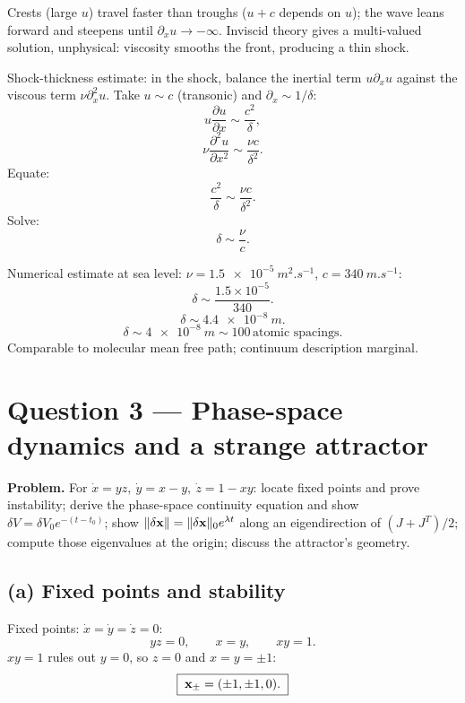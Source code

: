 \documentclass[11pt]{article}
\newcommand{\pd}[2]{\frac{\partial #1}{\partial #2}}
\newcommand{\pdd}[2]{\frac{\partial^{2} #1}{\partial #2^{2}}}
\begin{document}
Crests (large $u$) travel faster than troughs ($u+c$ depends on $u$); the wave leans forward and steepens until $\partial_x u\to-\infty$. Inviscid theory gives a multi-valued solution, unphysical: viscosity smooths the front, producing a thin shock.

Shock-thickness estimate: in the shock, balance the inertial term $u\partial_x u$ against the viscous term $\nu\partial_x^2 u$. Take $u\sim c$ (transonic) and $\partial_x \sim 1/\delta$:
\[ u\pd{u}{x} \sim \frac{c^2}{\delta}, \]
\[ \nu\pdd{u}{x} \sim \frac{\nu c}{\delta^2}. \]
Equate:
\[ \frac{c^2}{\delta} \sim \frac{\nu c}{\delta^2}. \]
Solve:
\begin{equation}
\boxed{\;\delta \sim \frac{\nu}{c}.\;}
\label{eq:shockwidth}
\end{equation}

Numerical estimate at sea level: $\nu = \SI{1.5e-5}{m^2.s^{-1}}$, $c=\SI{340}{m.s^{-1}}$:
\[ \delta \sim \frac{1.5\times 10^{-5}}{340}. \]
\[ \delta \sim \SI{4.4e-8}{m}. \]
\[ \boxed{\;\delta \sim \SI{4e-8}{m} \sim 100\,\text{atomic spacings}.\;} \]
Comparable to molecular mean free path; continuum description marginal.

\section*{Question 3 --- Phase-space dynamics and a strange attractor}

\textbf{Problem.} For $\dot x = yz,\ \dot y = x-y,\ \dot z = 1-xy$: locate fixed points and prove instability; derive the phase-space continuity equation and show $\delta V = \delta V_0 e^{-(t-t_0)}$; show $\|\delta\vb x\|=\|\delta\vb x\|_0 e^{\lambda t}$ along an eigendirection of $(J+J^T)/2$; compute those eigenvalues at the origin; discuss the attractor's geometry.

\subsection*{(a) Fixed points and stability}

Fixed points: $\dot x=\dot y=\dot z=0$:
\[ yz = 0,\qquad x = y,\qquad xy = 1. \]
$xy=1$ rules out $y=0$, so $z=0$ and $x=y=\pm 1$:
\[ \boxed{\;\vb x_\pm = (\pm 1,\pm 1,0).\;} \]
\end{document}
